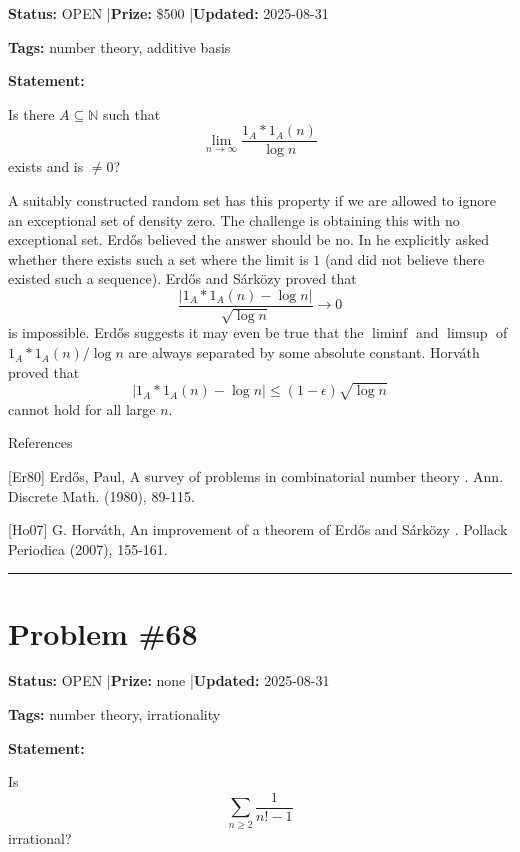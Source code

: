 \documentclass{article}
\begin{document}
\noindent\textbf{Status:} OPEN \quad|\quad \textbf{Prize:} \$500 \quad|\quad \textbf{Updated:} 2025-08-31

\noindent\textbf{Tags:} number theory, additive basis

\medskip

\noindent\textbf{Statement:}

Is there $A\subseteq \mathbb{N}$ such that\[\lim_{n\to \infty}\frac{1_A\ast 1_A(n)}{\log n}\]exists and is $\neq 0$?




A suitably constructed random set has this property if we are allowed to ignore an exceptional set of density zero. The challenge is obtaining this with no exceptional set. Erd\H{o}s believed the answer should be no. In \cite{Er80} he explicitly asked whether there exists such a set where the limit is $1$ (and did not believe there existed such a sequence). Erd\H{o}s and S\'{a}rk\"{o}zy proved that\[\frac{\lvert 1_A\ast 1_A(n)-\log n\rvert}{\sqrt{\log n}}\to 0\]is impossible. Erd\H{o}s suggests it may even be true that the $\liminf$ and $\limsup$ of $1_A\ast 1_A(n)/\log n$ are always separated by some absolute constant. Horv\'{a}th \cite{Ho07} proved that\[\lvert 1_A\ast 1_A(n)-\log n\rvert \leq (1-\epsilon)\sqrt{\log n}\]cannot hold for all large $n$.




References

[Er80] Erd\H{o}s, Paul, A survey of problems in combinatorial number theory . Ann. Discrete Math. (1980), 89-115.

[Ho07] G. Horv\'{a}th, An improvement of a theorem of Erd\H{o}s and S\'{a}rk\"{o}zy . Pollack Periodica (2007), 155-161.

\noindent\rule{\linewidth}{0.4pt}


\section{Problem \#68}
\label{prob:68}

\noindent\textbf{Status:} OPEN \quad|\quad \textbf{Prize:} none \quad|\quad \textbf{Updated:} 2025-08-31

\noindent\textbf{Tags:} number theory, irrationality

\medskip

\noindent\textbf{Statement:}

Is\[\sum_{n\geq 2}\frac{1}{n!-1}\]irrational?
\end{document}

